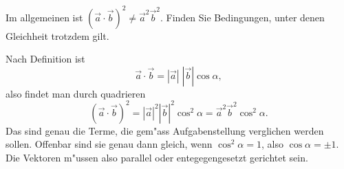 Im allgemeinen ist $(\vec a\cdot \vec b )^2\ne \vec a^2\vec b^2$.
Finden Sie Bedingungen, unter denen Gleichheit trotzdem gilt.

\begin{loesung}
Nach Definition ist
\[
\vec a\cdot\vec b=|\vec a|\;|\vec b|\cos\alpha ,
\]
also findet man durch quadrieren
\[
(\vec a\cdot\vec b)^2
=
|\vec a|^2|\vec b|^2 \cos^2 \alpha
=
\vec a^2\vec b^2 \cos^2 \alpha.
\]
Das sind genau die Terme, die gem"ass Aufgabenstellung verglichen werden
sollen. Offenbar sind sie genau dann gleich, wenn $\cos^2\alpha=1$,
also
$\cos\alpha=\pm 1$. Die Vektoren m"ussen also parallel oder
entegegengesetzt gerichtet sein.
\end{loesung}

